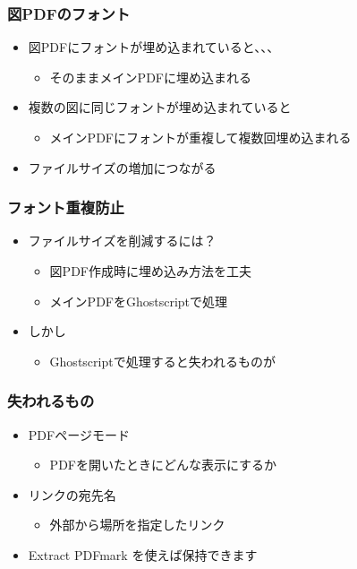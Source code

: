 \documentclass[unicode,17pt]{beamer}
\begin{document}
\begin{frame}\frametitle{図PDFのフォント}
  \begin{itemize}
  \item 図PDFにフォントが埋め込まれていると、、、
    \begin{itemize}
    \item そのままメインPDFに埋め込まれる
    \end{itemize}
  \item 複数の図に同じフォントが埋め込まれていると
    \begin{itemize}
    \item メインPDFにフォントが重複して複数回埋め込まれる
    \end{itemize}
  \item ファイルサイズの増加につながる
  \end{itemize}
\end{frame}

\begin{frame}\frametitle{フォント重複防止}
  \begin{itemize}
  \item ファイルサイズを削減するには？
    \begin{itemize}
    \item 図PDF作成時に埋め込み方法を工夫
    \item メインPDFをGhostscriptで処理
    \end{itemize}
  \item しかし
    \begin{itemize}
    \item Ghostscriptで処理すると失われるものが
    \end{itemize}
  \end{itemize}
\end{frame}

\begin{frame}\frametitle{失われるもの}
  \begin{itemize}
  \item PDFページモード
    \begin{itemize}
    \item PDFを開いたときにどんな表示にするか
    \end{itemize}
  \item リンクの宛先名
    \begin{itemize}
    \item 外部から場所を指定したリンク
    \end{itemize}
  \item Extract PDFmark を使えば保持できます
  \end{itemize}
\end{frame}
\end{document}
